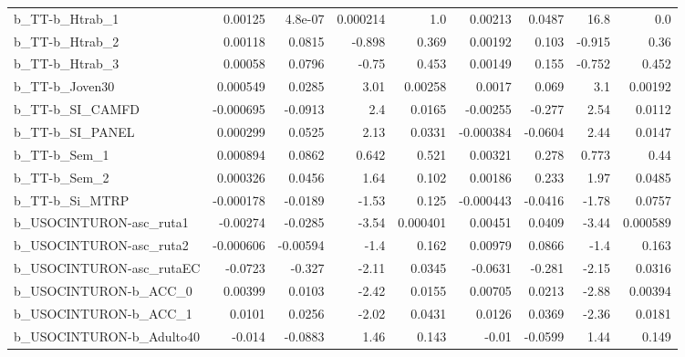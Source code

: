 \begin{tabular}{lrrrrrrrr}
b\_TT-b\_Htrab\_1             &     0.00125 &      4.8e-07 &  0.000214 &      1.0 &    0.00213 &      0.0487 &         16.8 &           0.0 \\
b\_TT-b\_Htrab\_2             &     0.00118 &       0.0815 &    -0.898 &    0.369 &    0.00192 &       0.103 &       -0.915 &          0.36 \\
b\_TT-b\_Htrab\_3             &     0.00058 &       0.0796 &     -0.75 &    0.453 &    0.00149 &       0.155 &       -0.752 &         0.452 \\
b\_TT-b\_Joven30             &    0.000549 &       0.0285 &      3.01 &  0.00258 &     0.0017 &       0.069 &          3.1 &       0.00192 \\
b\_TT-b\_SI\_CAMFD            &   -0.000695 &      -0.0913 &       2.4 &   0.0165 &   -0.00255 &      -0.277 &         2.54 &        0.0112 \\
b\_TT-b\_SI\_PANEL            &    0.000299 &       0.0525 &      2.13 &   0.0331 &  -0.000384 &     -0.0604 &         2.44 &        0.0147 \\
b\_TT-b\_Sem\_1               &    0.000894 &       0.0862 &     0.642 &    0.521 &    0.00321 &       0.278 &        0.773 &          0.44 \\
b\_TT-b\_Sem\_2               &    0.000326 &       0.0456 &      1.64 &    0.102 &    0.00186 &       0.233 &         1.97 &        0.0485 \\
b\_TT-b\_Si\_MTRP             &   -0.000178 &      -0.0189 &     -1.53 &    0.125 &  -0.000443 &     -0.0416 &        -1.78 &        0.0757 \\
b\_USOCINTURON-asc\_ruta1    &    -0.00274 &      -0.0285 &     -3.54 & 0.000401 &    0.00451 &      0.0409 &        -3.44 &      0.000589 \\
b\_USOCINTURON-asc\_ruta2    &   -0.000606 &     -0.00594 &      -1.4 &    0.162 &    0.00979 &      0.0866 &         -1.4 &         0.163 \\
b\_USOCINTURON-asc\_rutaEC   &     -0.0723 &       -0.327 &     -2.11 &   0.0345 &    -0.0631 &      -0.281 &        -2.15 &        0.0316 \\
b\_USOCINTURON-b\_ACC\_0      &     0.00399 &       0.0103 &     -2.42 &   0.0155 &    0.00705 &      0.0213 &        -2.88 &       0.00394 \\
b\_USOCINTURON-b\_ACC\_1      &      0.0101 &       0.0256 &     -2.02 &   0.0431 &     0.0126 &      0.0369 &        -2.36 &        0.0181 \\
b\_USOCINTURON-b\_Adulto40   &      -0.014 &      -0.0883 &      1.46 &    0.143 &      -0.01 &     -0.0599 &         1.44 &         0.149 \\

\end{tabular}
